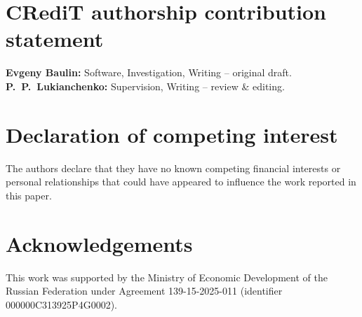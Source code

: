 \documentclass[preprint,review,authoryear,12pt]{elsarticle}
\begin{document}
\section*{CRediT authorship contribution statement}

\textbf{Evgeny Baulin:} Software, Investigation, Writing -- original draft.
\textbf{P.~P.~Lukianchenko:} Supervision, Writing -- review \& editing.

\section*{Declaration of competing interest}

The authors declare that they have no known competing financial interests or personal
relationships that could have appeared to influence the work reported in this paper.

\section*{Acknowledgements}

This work was supported by the Ministry of Economic Development of the Russian
Federation under Agreement 139-15-2025-011 (identifier 000000C313925P4G0002).
\end{document}
